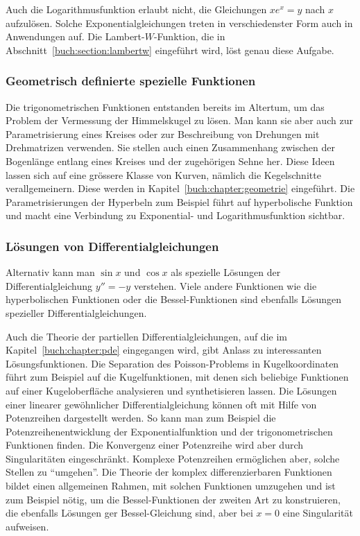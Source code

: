Auch die Logarithmusfunktion erlaubt nicht, die Gleichungen $xe^x=y$
nach $x$ aufzulösen.
Solche Exponentialgleichungen treten in verschiedenster Form auch in 
Anwendungen auf.
Die Lambert-$W$-Funktion, die in Abschnitt~\ref{buch:section:lambertw}
eingeführt wird, löst genau diese Aufgabe.


%
%
\subsubsection{Geometrisch definierte spezielle Funktionen}
Die trigonometrischen Funktionen entstanden bereits im Altertum,
um das Problem der Vermessung der Himmelskugel zu lösen.
Man kann sie aber auch zur Parametrisierung eines Kreises oder
zur Beschreibung von Drehungen mit Drehmatrizen verwenden.
Sie stellen auch einen Zusammenhang zwischen der Bogenlänge 
entlang eines Kreises und der zugehörigen Sehne her.
Diese Ideen lassen sich auf eine grössere Klasse von Kurven,
nämlich die Kegelschnitte verallgemeinern.
Diese werden in Kapitel~\ref{buch:chapter:geometrie} eingeführt.
Die Parametrisierungen der Hyperbeln zum Beispiel führt auf
hyperbolische Funktion und macht eine Verbindung zu Exponential-
und Logarithmusfunktion sichtbar.

%
%
\subsubsection{Lösungen von Differentialgleichungen}
Alternativ kann man $\sin x$ und $\cos x$ als spezielle Lösungen der
Differentialgleichung $y''=-y$ verstehen.
Viele andere Funktionen wie die hyperbolischen Funktionen oder die
Bessel-Funktionen sind ebenfalls Lösungen spezieller Differentialgleichungen.

Auch die Theorie der partiellen Differentialgleichungen, auf die
im Kapitel~\ref{buch:chapter:pde} eingegangen wird, gibt Anlass
zu interessanten Lösungsfunktionen.
Die Separation des Poisson-Problems in Kugelkoordinaten führt zum Beispiel
auf die Kugelfunktionen, mit denen sich beliebige Funktionen auf einer
Kugeloberfläche analysieren und synthetisieren lassen.
Die Lösungen einer linearer gewöhnlicher Differentialgleichung können
oft mit Hilfe von Potenzreihen dargestellt werden.
So kann man zum Beispiel die Potenzreihenentwicklung der Exponentialfunktion
und der trigonometrischen Funktionen finden.
Die Konvergenz einer Potenzreihe wird aber durch Singularitäten
eingeschränkt.
Komplexe Potenzreihen ermöglichen aber, solche Stellen zu ``umgehen''.
Die Theorie der komplex differenzierbaren Funktionen bildet einen
allgemeinen Rahmen, mit solchen Funktionen umzugehen und ist zum 
Beispiel nötig, um die Bessel-Funktionen der zweiten Art zu konstruieren,
die ebenfalls Lösungen ger Bessel-Gleichung sind, aber bei $x=0$
eine Singularität aufweisen.

